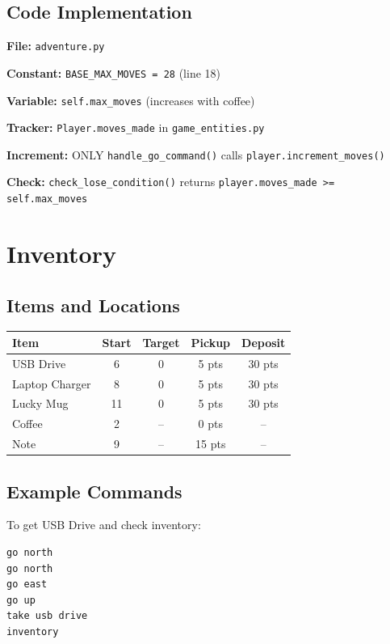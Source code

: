 \documentclass[12pt]{article}
\begin{document}
\subsection{Code Implementation}

\textbf{File:} \texttt{adventure.py}

\textbf{Constant:} \texttt{BASE\_MAX\_MOVES = 28} (line 18)

\textbf{Variable:} \texttt{self.max\_moves} (increases with coffee)

\textbf{Tracker:} \texttt{Player.moves\_made} in \texttt{game\_entities.py}

\textbf{Increment:} ONLY \texttt{handle\_go\_command()} calls \texttt{player.increment\_moves()}

\textbf{Check:} \texttt{check\_lose\_condition()} returns \texttt{player.moves\_made >= self.max\_moves}

\section{Inventory}

\subsection{Items and Locations}

\begin{table}[h]
\centering
\begin{tabular}{lcccc}
\toprule
\textbf{Item} & \textbf{Start} & \textbf{Target} & \textbf{Pickup} & \textbf{Deposit} \\
\midrule
USB Drive & 6 & 0 & 5 pts & 30 pts \\
Laptop Charger & 8 & 0 & 5 pts & 30 pts \\
Lucky Mug & 11 & 0 & 5 pts & 30 pts \\
Coffee & 2 & -- & 0 pts & -- \\
Note & 9 & -- & 15 pts & -- \\
\bottomrule
\end{tabular}
\end{table}

\subsection{Example Commands}

To get USB Drive and check inventory:

\begin{verbatim}
go north
go north
go east
go up
take usb drive
inventory
\end{verbatim}
\end{document}
